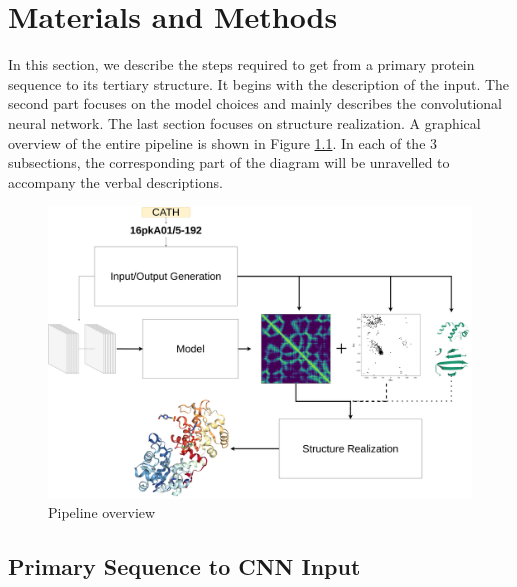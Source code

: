 \chapter{Materials and Methods}

In this section, we describe the steps required to get from a primary protein sequence to its tertiary structure.
It begins with the description of the input. 
The second part focuses on the model choices and mainly describes the convolutional neural network. 
The last section focuses on structure realization. 
A graphical overview of the entire pipeline is shown in Figure \ref{fig:project_pipeline}. 
In each of the 3 subsections, the corresponding part of the diagram will be unravelled to accompany the verbal descriptions.

\begin{figure}[ht]
    \centering
    \includegraphics[width=\linewidth]{imgs_tomas/Project_pipeline_small.png}
    \caption{Pipeline overview}
    \label{fig:project_pipeline}
\end{figure}

\section{Primary Sequence to CNN Input}

